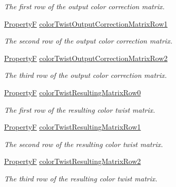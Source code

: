 \begin{DoxyCompactItemize}
\begin{DoxyCompactList}\small\item\em The first row of the output color correction matrix. \end{DoxyCompactList}\item 
\hyperlink{group___common_interface_gaf54865fe5a3d5cfd15f9a111b40d09f9}{Property\+F} \hyperlink{classmv_i_m_p_a_c_t_1_1acquire_1_1_image_processing_a75cccfd023c20569ff5ff6e3e522595a}{color\+Twist\+Output\+Correction\+Matrix\+Row1}
\begin{DoxyCompactList}\small\item\em The second row of the output color correction matrix. \end{DoxyCompactList}\item 
\hyperlink{group___common_interface_gaf54865fe5a3d5cfd15f9a111b40d09f9}{Property\+F} \hyperlink{classmv_i_m_p_a_c_t_1_1acquire_1_1_image_processing_abe3fe5344ec8268ad6936c0401c8231b}{color\+Twist\+Output\+Correction\+Matrix\+Row2}
\begin{DoxyCompactList}\small\item\em The third row of the output color correction matrix. \end{DoxyCompactList}\item 
\hyperlink{group___common_interface_gaf54865fe5a3d5cfd15f9a111b40d09f9}{Property\+F} \hyperlink{classmv_i_m_p_a_c_t_1_1acquire_1_1_image_processing_ad95d05e048058217b600eec09753435f}{color\+Twist\+Resulting\+Matrix\+Row0}
\begin{DoxyCompactList}\small\item\em The first row of the resulting color twist matrix. \end{DoxyCompactList}\item 
\hyperlink{group___common_interface_gaf54865fe5a3d5cfd15f9a111b40d09f9}{Property\+F} \hyperlink{classmv_i_m_p_a_c_t_1_1acquire_1_1_image_processing_a90cacc49731a478754e9c973a08e8a91}{color\+Twist\+Resulting\+Matrix\+Row1}
\begin{DoxyCompactList}\small\item\em The second row of the resulting color twist matrix. \end{DoxyCompactList}\item 
\hyperlink{group___common_interface_gaf54865fe5a3d5cfd15f9a111b40d09f9}{Property\+F} \hyperlink{classmv_i_m_p_a_c_t_1_1acquire_1_1_image_processing_a357603532ef84699c0515474c3384dca}{color\+Twist\+Resulting\+Matrix\+Row2}
\begin{DoxyCompactList}\small\item\em The third row of the resulting color twist matrix. \end{DoxyCompactList}\item 

\end{DoxyCompactItemize}

